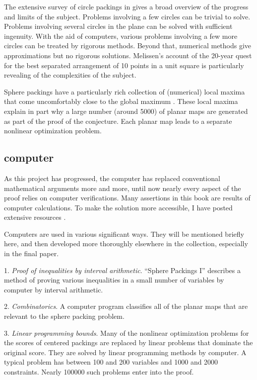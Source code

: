 The extensive survey of circle packings
in \cite{Mel97} gives a broad overview of the progress and limits
of the subject.
Problems involving a few circles can be
trivial to solve.
Problems involving several circles in the plane can be solved with
sufficient ingenuity.
With the aid of computers, various  problems involving
a few more circles can be
treated by rigorous methods.
Beyond that, numerical methods
give approximations but no rigorous solutions.
Melissen's account of
the 20-year quest for the best separated arrangement of 10
points in a unit square is particularly revealing of the complexities
of the subject.

Sphere packings have a particularly rich collection of (numerical)
local maxima that come uncomfortably close to the global maximum
\cite{spp}. These local maxima explain in part why a large number
(around 5000) of planar maps are generated as part of the proof of
the conjecture.  Each planar map leads to a separate nonlinear
optimization problem.



\subsection{computer}

As this project has progressed, the computer has replaced conventional
mathematical arguments more and more, until now
 nearly every aspect of the proof relies on
computer verifications.  Many assertions in this book
 are results of computer calculations.
To make the solution more accessible, I have
posted extensive resources \cite{web}.

Computers are used in various significant ways.  They will be
mentioned briefly here, and then developed more thoroughly elsewhere
in the collection, especially in the final paper.

1. {\it  Proof of inequalities by interval arithmetic}.  ``Sphere Packings
I'' describes a method of proving various inequalities in a small number
of variables by computer by interval arithmetic.

2.  {\it Combinatorics}.  A computer program classifies all of the planar maps
that are relevant to the sphere packing problem.

3. {\it  Linear programming bounds}.  Many of the nonlinear optimization
    problems for the scores of centered packings are replaced by linear
    problems that dominate the original score.  They are solved
    by linear programming methods by computer.  A typical problem has
    between 100 and 200 variables and 1000 and 2000 constraints.  Nearly
    100000
    such problems enter into the proof.


